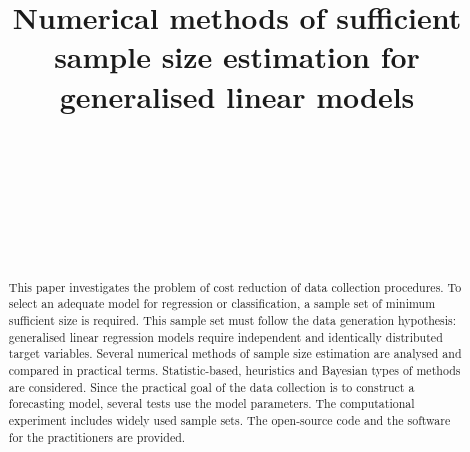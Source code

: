 \documentclass[
11pt,%
tightenlines,%
twoside,%
onecolumn,%
nofloats,%
nobibnotes,%
nofootinbib,%
superscriptaddress,%
noshowpacs,%
centertags]%
{revtex4}
\begin{document}
\title{Numerical methods of sufficient sample size estimation for generalised linear models}
\author{~}

\author{~}

\author{~}

\author{~}


\received{}



\begin{abstract}
This paper investigates the problem of cost reduction of data collection procedures. To select an adequate model for regression or classification, a sample set of minimum sufficient size is required. This sample set must follow the data generation hypothesis: generalised linear regression models require independent and identically distributed target variables.  Several numerical methods of sample size estimation are analysed and compared in practical terms. Statistic-based, heuristics and Bayesian types of methods are considered. Since the practical goal of the data collection is to construct a forecasting model, several tests use the model parameters.  The computational experiment includes widely used sample sets. The open-source code and the software for the practitioners are provided.
\end{abstract}


\maketitle
\end{document}
